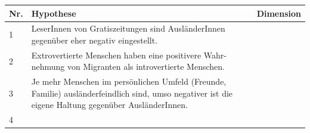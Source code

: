 \documentclass[]{article}
\begin{document}
\begin{longtable}[]{@{}lll@{}}
\toprule
\begin{minipage}[b]{0.09\columnwidth}\raggedright\strut
Nr.\strut
\end{minipage} & \begin{minipage}[b]{0.59\columnwidth}\raggedright\strut
Hypothese\strut
\end{minipage} & \begin{minipage}[b]{0.23\columnwidth}\raggedright\strut
Dimension\strut
\end{minipage}\tabularnewline
\midrule
\endhead
\begin{minipage}[t]{0.09\columnwidth}\raggedright\strut
1\strut
\end{minipage} & \begin{minipage}[t]{0.59\columnwidth}\raggedright\strut
LeserInnen von Gratiszeitungen sind AusländerInnen gegenüber eher
negativ eingestellt.\strut
\end{minipage} & \begin{minipage}[t]{0.23\columnwidth}\raggedright\strut
\strut
\end{minipage}\tabularnewline
\begin{minipage}[t]{0.09\columnwidth}\raggedright\strut
2\strut
\end{minipage} & \begin{minipage}[t]{0.59\columnwidth}\raggedright\strut
Extrovertierte Menschen haben eine positivere Wahr- nehmung von
Migranten als introvertierte Menschen.\strut
\end{minipage} & \begin{minipage}[t]{0.23\columnwidth}\raggedright\strut
\strut
\end{minipage}\tabularnewline
\begin{minipage}[t]{0.09\columnwidth}\raggedright\strut
3\strut
\end{minipage} & \begin{minipage}[t]{0.59\columnwidth}\raggedright\strut
Je mehr Menschen im persönlichen Umfeld (Freunde, Familie)
ausländerfeindlich sind, umso negativer ist die eigene Haltung gegenüber
AusländerInnen.\strut
\end{minipage} & \begin{minipage}[t]{0.23\columnwidth}\raggedright\strut
\strut
\end{minipage}\tabularnewline
\begin{minipage}[t]{0.09\columnwidth}\raggedright\strut
4\strut
\end{minipage} & \begin{minipage}[t]{0.59\columnwidth}\raggedright\strut

\end{minipage}
\end{longtable}
\end{document}

